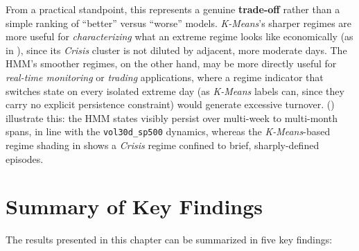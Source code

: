 From a practical standpoint, this represents a genuine
\textbf{trade-off} rather than a simple ranking of ``better'' versus
``worse'' models. \textit{K-Means}'s sharper regimes are more useful for
\emph{characterizing} what an extreme regime looks like economically
(as in ), since its \emph{Crisis} cluster is
not diluted by adjacent, more moderate days. The HMM's smoother regimes,
on the other hand, may be more directly useful for \emph{real-time
monitoring} or \emph{trading} applications, where a regime indicator that
switches state on every isolated extreme day (as \textit{K-Means} labels
can, since they carry no explicit persistence constraint) would generate
excessive turnover. 
() illustrate this: the HMM states visibly
persist over multi-week to multi-month spans, in line with the
\texttt{vol30d\_sp500} dynamics, whereas the \textit{K-Means}-based regime
shading in  shows a
\emph{Crisis} regime confined to brief, sharply-defined episodes.

\section{Summary of Key Findings}
\label{sec:results-summary}

The results presented in this chapter can be summarized in five key
findings:

